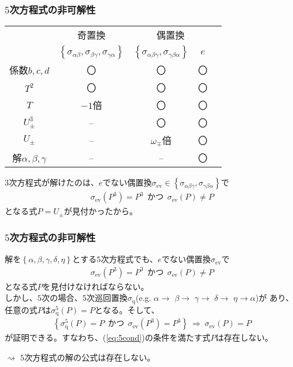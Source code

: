\documentclass[12pt, t]{beamer}
\newcommand{\clr}[1]{\left\{{}#1\right\}{}}
\begin{document}
\begin{frame}
\frametitle{$5$次方程式の非可解性}
\begin{table}
\begin{tabular}{c|cccc}
       &奇置換                                & \multicolumn{2}{|c}{偶置換} \\
       &$\clr{\sigma_{\alpha \beta},\sigma_{\beta \gamma},\sigma_{\gamma \alpha}}$ & \multicolumn{1}{|c}{$\clr{\sigma_{\alpha \beta \gamma}, \sigma_{\gamma \beta \alpha}}$} & $e$ \\ \hline
  係数$b,c,d$&〇&〇&〇 \\
  $T^2$&〇&〇&〇 \\
  $T$  &$-1$倍&〇&〇 \\
  $U_{\pm}^3$ &--&〇&〇 \\
  $U_{\pm}$   &--&$\omega_{\mp}$倍&〇 \\
  解$\alpha, \beta,\gamma$ &--&--&〇
\end{tabular}
\end{table}
\vspace{-1em}
$3$次方程式が解けたのは、$e$でない偶置換$\sigma_\mathrm{ev} \in \clr{\sigma_{\alpha \beta \gamma}, \sigma_{\gamma \beta \alpha}}$で
\begin{align}
  \sigma_\mathrm{ev}(P^3) = P^3 \ \ \text{かつ} \ \ \sigma_\mathrm{ev}(P) \neq P
\end{align}
となる式$P = U_\pm$が見付かったから。
\end{frame}

\begin{frame}
\frametitle{$5$次方程式の非可解性}
解を$\clr{\alpha, \beta, \gamma, \delta, \eta}$とする$5$次方程式でも、$e$でない偶置換$\sigma_\mathrm{ev}$で
\begin{align}
  \sigma_\mathrm{ev}(P^3) = P^3 \ \ \text{かつ} \ \ \sigma_\mathrm{ev}(P) \neq P \label{eq:5cond}
\end{align}
となる式$P$を見付けなければならない。\\
しかし、$5$次の場合、$5$次巡回置換$\sigma_\mathrm{q}$(e.g. $\alpha \to$ $\beta \to$ $\gamma \to$ $\delta \to$ $\eta \to \alpha$)が
あり、任意の式$P$は$\sigma_{\mathrm{q}}^5(P) = P$となる。そして、
\begin{align}
  \clr{\sigma_{\mathrm{q}}^5(P) = P \ \ \text{かつ} \ \ \sigma_\mathrm{ev}(P^3) = P^3} \ \Rightarrow \ \sigma_\mathrm{ev}(P) = P
\end{align}
が証明できる。すなわち、(\ref{eq:5cond})の条件を満たす式$P$は存在しない。

$\rightsquigarrow$ $5$次方程式の解の公式は存在しない。
\end{frame}
\end{document}

